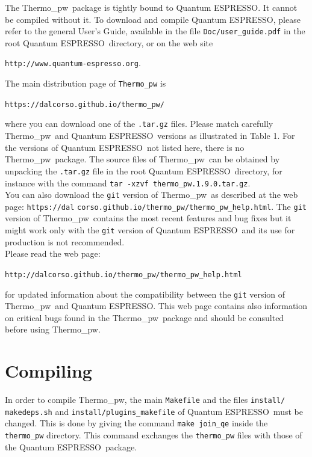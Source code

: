 \documentclass[12pt,a4paper,twoside]{report}
\def\qe{{\sc Quantum ESPRESSO}}
\def\thermo{{\sc Thermo}\_{\sc pw}}
\begin{document}
The \thermo\ package is tightly bound to \qe. It cannot be compiled without
it. To download and compile \qe, please 
refer to the general User's Guide, available in the file \texttt{Doc/user\_guide.pdf}
in the root \qe\ directory, or on the web site 
\begin{center}
{\texttt{http://www.quantum-espresso.org}}.
\end{center}
The main distribution page of \texttt{Thermo\_pw} is 
\begin{center}
\texttt{https://dalcorso.github.io/thermo\_pw/} 
\end{center}
where you can download one of the \texttt{.tar.gz} files.
Please match carefully \thermo\ and \qe\ versions
as illustrated in Table 1. 
For the versions of \qe\ not listed here, there is no \thermo\ 
package. The source files of \thermo\ can be obtained by
unpacking the \texttt{.tar.gz} file in the root \qe\ directory, for
instance with the command \texttt{tar -xzvf thermo\_pw.1.9.0.tar.gz}.\\
You can also download the \texttt{git} version of 
\thermo\ as described at
the web page: 
\texttt{https://dal} \texttt{corso.github.io/thermo\_pw/thermo\_pw\_help.html}.
The \texttt{git} version of \thermo\ contains the most recent
features and bug fixes but it might work only with the \texttt{git} 
version of \qe\ and its use for production is not recommended. \\
Please read the web page: 
\begin{center}
\texttt{http://dalcorso.github.io/thermo\_pw/thermo\_pw\_help.html} 
\end{center}
for updated information about the compatibility between the \texttt{git} 
version of \thermo\ and \qe. 
This web page contains also information on critical bugs found in the 
\thermo\ package and should be consulted before using 
\thermo.

\newpage
{\color{coral}\section{Compiling}}
\color{black}

In order to compile \thermo, the main \texttt{Makefile} and the files
\texttt{install/} \texttt{makedeps.sh} and \texttt{install/plugins\_makefile}
of \qe\ must be changed. This is done by giving the command 
\texttt{make join\_qe} inside the \texttt{thermo\_pw} directory. 
This command exchanges
the \texttt{thermo\_pw} files with those of the \qe\ package.
\end{document}
